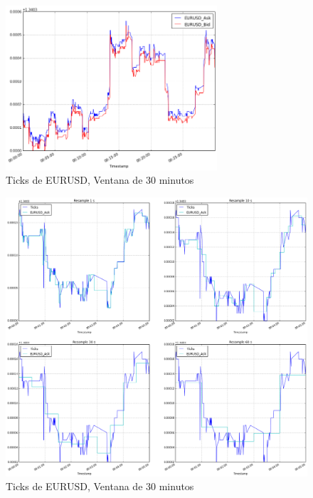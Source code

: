 \begin{figure}[h!t]
    \begin{center}
        \includegraphics[width=0.7\textwidth]{images/eurusd}
        \caption{Ticks de EURUSD, Ventana de 30 minutos}
        \label{fig:eurusd_ticks}
    \end{center}
\end{figure}

\begin{figure}[h!t]
    \begin{center}
        \includegraphics[width=\textwidth]{images/resample_freq}
        \caption{Ticks de EURUSD, Ventana de 30 minutos}
        \label{fig:eurusd_freq}
    \end{center}
\end{figure}

